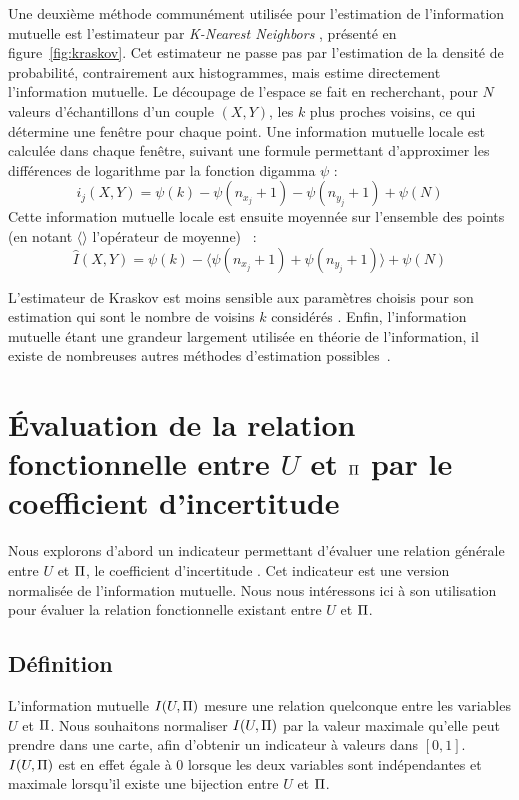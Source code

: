 \documentclass[../main]{subfiles}
\begin{document}
Une deuxième méthode communément utilisée pour l'estimation de l'information mutuelle est l'estimateur par \emph{K-Nearest Neighbors} \parencite{2004kraskov}, présenté en figure~\ref{fig:kraskov}.
Cet estimateur ne passe pas par l'estimation de la densité de probabilité, contrairement aux histogrammes, mais estime directement l'information mutuelle.
Le découpage de l'espace se fait en recherchant, pour $N$ valeurs d'échantillons d'un couple $(X,Y)$, les $k$ plus proches voisins, ce qui détermine une fenêtre pour chaque point. Une information mutuelle locale est calculée dans chaque fenêtre, suivant une formule permettant d'approximer les différences de logarithme par la fonction digamma $\psi$ : 
$$i_j(X,Y) = \psi(k) - \psi(n_{x_j} + 1) - \psi(n_{y_j} +1) + \psi(N)$$
Cette information mutuelle locale est ensuite moyennée sur l'ensemble des points (en notant $\langle \rangle$ l'opérateur de moyenne) ~: 
\begin{equation}\label{eq:knn}
    \hat{I}(X,Y) = \psi(k) - \langle\psi(n_{x_j} + 1) + \psi(n_{y_j} +1)\rangle + \psi(N)
\end{equation}
    
L'estimateur de Kraskov est moins sensible aux paramètres choisis pour son estimation qui sont le nombre de voisins $k$ considérés \parencite{ross_mutual_2014}.
Enfin, l'information mutuelle étant une grandeur largement utilisée en théorie de l'information, il existe de nombreuses autres méthodes d'estimation possibles~\parencite{Doquire2012ACO}.

\section{\'Evaluation de la relation fonctionnelle entre $U$ et $\Pi$ par le coefficient d'incertitude}

Nous explorons d'abord un indicateur permettant d'évaluer une relation générale entre $U$ et $\Pi$, le coefficient d'incertitude \parencite{Theil1961EconomicFA}. 
Cet indicateur est une version normalisée de l'information mutuelle. Nous nous intéressons ici à son utilisation pour évaluer la relation fonctionnelle existant entre $U$ et $\Pi$.

\subsection{Définition}

L'information mutuelle $I(U,\Pi)$ mesure une relation quelconque entre les variables $U$ et $\Pi$.
Nous souhaitons normaliser $I(U,\Pi)$ par la valeur maximale qu'elle peut prendre dans une carte, afin d'obtenir un indicateur à valeurs dans $[0,1]$. 
$I(U,\Pi)$ est en effet égale à 0 lorsque les deux variables sont indépendantes et maximale lorsqu'il existe une bijection entre $U$ et $\Pi$.
\end{document}
